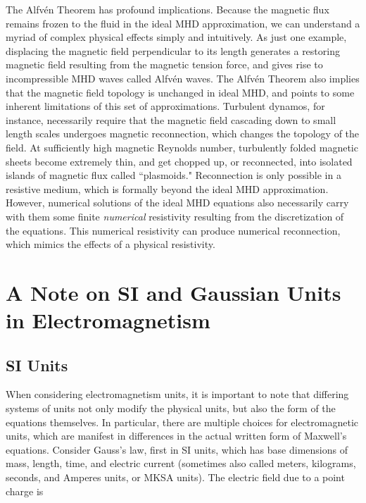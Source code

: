 \documentclass[notoc]{tufte-handout}
\begin{document}
The Alfvén Theorem has profound implications. Because the magnetic flux remains frozen to the fluid in the ideal MHD approximation, we can understand a myriad of complex physical effects simply and intuitively. As just one example, displacing the magnetic field perpendicular to its length generates a restoring magnetic field resulting from the magnetic tension force, and gives rise to incompressible MHD waves called Alfvén waves. 
The Alfvén Theorem also implies that the magnetic field topology is unchanged in ideal MHD, and points to some inherent limitations of this set of approximations. Turbulent dynamos, for instance, necessarily require that the magnetic field cascading down to small length scales undergoes magnetic reconnection, which changes the topology of the field. At sufficiently high magnetic Reynolds number, turbulently folded magnetic sheets become extremely thin, and get chopped up, or reconnected,  into isolated islands of magnetic flux called ``plasmoids." 
Reconnection is only possible in a resistive medium, which is formally beyond the ideal MHD approximation. However, numerical solutions of the ideal MHD equations also necessarily carry with them some finite {\it numerical} resistivity resulting from the discretization of the equations. This numerical resistivity can produce numerical reconnection, which mimics the effects of a physical resistivity.

\vfill\eject




\appendix

\section  {A Note on SI and Gaussian  Units in Electromagnetism}

\subsection {SI Units}

When considering electromagnetism units, it is important to note that differing systems of units not only modify the physical units, but also the form of the equations themselves. In particular, there are multiple choices for electromagnetic units,  which are  manifest in  differences in the actual written form of Maxwell's equations. Consider Gauss's law, first in SI units, which has base dimensions of mass, length, time, and electric current (sometimes also called meters, kilograms, seconds, and Amperes units, or MKSA units).  The electric field due to a point charge is 
\end{document}
